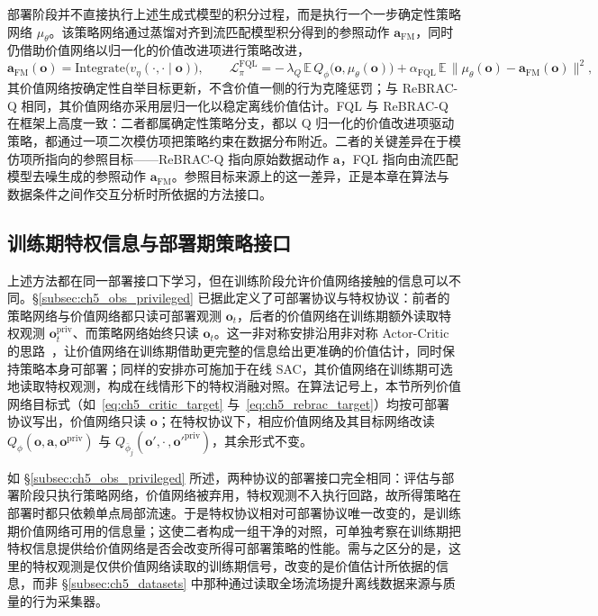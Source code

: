 部署阶段并不直接执行上述生成式模型的积分过程，而是执行一个一步确定性策略网络 $\mu_\theta$。该策略网络通过蒸馏对齐到流匹配模型积分得到的参照动作 $\mathbf{a}_{\mathrm{FM}}$，同时仍借助价值网络以归一化的价值改进项进行策略改进，
\begin{equation}
\mathbf{a}_{\mathrm{FM}}(\mathbf{o}) = \mathrm{Integrate}\big(v_\eta(\cdot,\cdot\mid\mathbf{o})\big),
\qquad
\mathcal{L}_{\pi}^{\mathrm{FQL}}
= -\,\lambda_Q\,\mathbb{E}\,Q_\phi\big(\mathbf{o},\mu_\theta(\mathbf{o})\big)
+ \alpha_{\mathrm{FQL}}\,\mathbb{E}\,\big\|\mu_\theta(\mathbf{o}) - \mathbf{a}_{\mathrm{FM}}(\mathbf{o})\big\|^2,
\label{eq:ch5_fql_actor}
\end{equation}
其价值网络按确定性自举目标更新，不含价值一侧的行为克隆惩罚；与 ReBRAC-Q 相同，其价值网络亦采用层归一化以稳定离线价值估计。FQL 与 ReBRAC-Q 在框架上高度一致：二者都属确定性策略分支，都以 Q 归一化的价值改进项驱动策略，都通过一项二次模仿项把策略约束在数据分布附近。二者的关键差异在于模仿项所指向的参照目标——ReBRAC-Q 指向原始数据动作 $\mathbf{a}$，FQL 指向由流匹配模型去噪生成的参照动作 $\mathbf{a}_{\mathrm{FM}}$。参照目标来源上的这一差异，正是本章在算法与数据条件之间作交互分析时所依据的方法接口。

\subsection{训练期特权信息与部署期策略接口}\label{subsec:ch5_method_protocol}

上述方法都在同一部署接口下学习，但在训练阶段允许价值网络接触的信息可以不同。\S\ref{subsec:ch5_obs_privileged} 已据此定义了可部署协议与特权协议：前者的策略网络与价值网络都只读可部署观测 $\mathbf{o}_t$，后者的价值网络在训练期额外读取特权观测 $\mathbf{o}_t^{\mathrm{priv}}$、而策略网络始终只读 $\mathbf{o}_t$。这一非对称安排沿用非对称 Actor-Critic 的思路~\citep{pinto2017asymmetric}，让价值网络在训练期借助更完整的信息给出更准确的价值估计，同时保持策略本身可部署；同样的安排亦可施加于在线 SAC，其价值网络在训练期可选地读取特权观测，构成在线情形下的特权消融对照。在算法记号上，本节所列价值网络目标式（如~\eqref{eq:ch5_critic_target} 与~\eqref{eq:ch5_rebrac_target}）均按可部署协议写出，价值网络只读 $\mathbf{o}$；在特权协议下，相应价值网络及其目标网络改读 $Q_\phi(\mathbf{o},\mathbf{a},\mathbf{o}^{\mathrm{priv}})$ 与 $Q_{\bar\phi_j}(\mathbf{o}',\cdot\,,\mathbf{o}'^{\mathrm{priv}})$，其余形式不变。

如 \S\ref{subsec:ch5_obs_privileged} 所述，两种协议的部署接口完全相同：评估与部署阶段只执行策略网络，价值网络被弃用，特权观测不入执行回路，故所得策略在部署时都只依赖单点局部流速。于是特权协议相对可部署协议唯一改变的，是训练期价值网络可用的信息量；这使二者构成一组干净的对照，可单独考察在训练期把特权信息提供给价值网络是否会改变所得可部署策略的性能。需与之区分的是，这里的特权观测是仅供价值网络读取的训练期信号，改变的是价值估计所依据的信息，而非 \S\ref{subsec:ch5_datasets} 中那种通过读取全场流场提升离线数据来源与质量的行为采集器。

